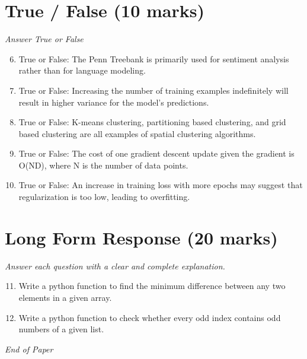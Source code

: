 \documentclass[12pt]{article}
\begin{document}
\section*{True / False (10 marks)}
\textit{Answer True or False}
\begin{enumerate}[label=\arabic*.]
\setcounter{enumi}{5}
\item True or False: The Penn Treebank is primarily used for sentiment analysis rather than for language modeling.
\item True or False: Increasing the number of training examples indefinitely will result in higher variance for the model's predictions.
\item True or False: K-means clustering, partitioning based clustering, and grid based clustering are all examples of spatial clustering algorithms.
\item True or False: The cost of one gradient descent update given the gradient is O(ND), where N is the number of data points.
\item True or False: An increase in training loss with more epochs may suggest that regularization is too low, leading to overfitting.
\end{enumerate}

\section*{Long Form Response (20 marks)}
\textit{Answer each question with a clear and complete explanation.}
\begin{enumerate}[label=\arabic*.]
\setcounter{enumi}{10}
\item Write a python function to find the minimum difference between any two elements in a given array.
\item Write a python function to check whether every odd index contains odd numbers of a given list.
\end{enumerate}

\vfill
\noindent\textit{End of Paper}
\end{document}
